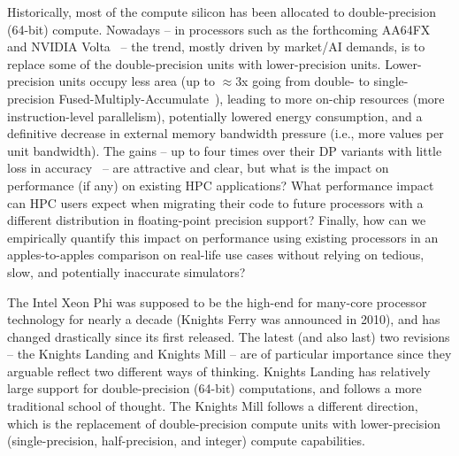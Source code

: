Historically, most of the compute silicon has been allocated to double-precision (64-bit) compute.
Nowadays -- in processors such as the forthcoming AA64FX~\cite{yoshida_fujitsu_2018} and NVIDIA
Volta~\cite{choquette_volta:_2018} -- the trend, mostly driven by market/AI demands, is to replace
some of the double-precision units with lower-precision units.
Lower-precision units occupy less area (up to $\approx$3x going from double- to single-precision
Fused-Multiply-Accumulate~\cite{pu_fpmax:_2016}), leading to more on-chip resources (more
instruction-level parallelism), potentially lowered energy consumption, and a definitive
decrease in external memory bandwidth pressure (i.e., more values per unit bandwidth).
The gains -- up to four times over their DP variants with little loss in
accuracy~\cite{haidar_harnessing_2018} -- are attractive and clear, but what is the impact on
performance (if any) on existing HPC applications? What performance impact can HPC users expect when migrating their code to future processors with a different distribution
in floating-point precision support? Finally, how can we empirically quantify this impact on
performance using existing processors in an apples-to-apples comparison on real-life use cases
without relying on tedious, slow, and potentially inaccurate simulators? %

The Intel Xeon Phi was supposed to be the high-end for many-core processor technology for nearly
a decade (Knights Ferry was announced in 2010), and has changed drastically since its first released.
The latest (and also last) two revisions -- the Knights Landing and Knights Mill -- are of
particular importance since they arguable reflect two different ways of thinking. Knights Landing
has relatively large support for double-precision (64-bit) computations, and follows a
more traditional school of thought. The Knights Mill follows a different direction, which is the replacement
of double-precision compute units with lower-precision (single-precision, half-precision, and integer)
compute capabilities.

